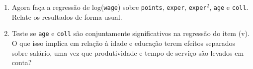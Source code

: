 \documentclass[12pt,letterpaper, onecolumn]{exam}
\begin{document}
\begin{questions}
\begin{enumerate}[label=(\roman*)]
			\item Agora faça a regressão de log(\texttt{wage}) sobre \texttt{points}, \texttt{exper}, \texttt{exper$^2$}, \texttt{age} e \texttt{coll}. Relate os resultados de forma usual.
			
			\item Teste se \texttt{age} e \texttt{coll} são conjuntamente significativos na regressão do item (v). O que isso implica em relação à idade e educação terem efeitos separados sobre salário, uma vez que produtividade e tempo de serviço são levados em conta?
		\end{enumerate}
		
	\end{questions}
	
\end{document}
